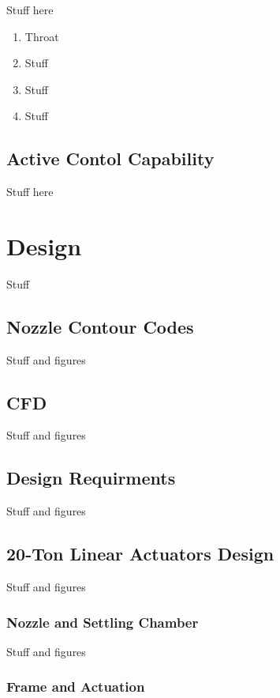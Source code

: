 Stuff here \cite{saric}

\begin{enumerate}
    \item Throat
    \item Stuff
    \item Stuff
    \item Stuff
\end{enumerate}

\subsection{Active Contol Capability}

Stuff here

\section{Design}

Stuff

\subsection{Nozzle Contour Codes}

Stuff and figures

\subsection{CFD}

Stuff and figures

\subsection{Design Requirments}

Stuff and figures

\subsection{20-Ton Linear Actuators Design}

Stuff and figures

\subsubsection{Nozzle and Settling Chamber}

Stuff and figures

\subsubsection{Frame and Actuation}

